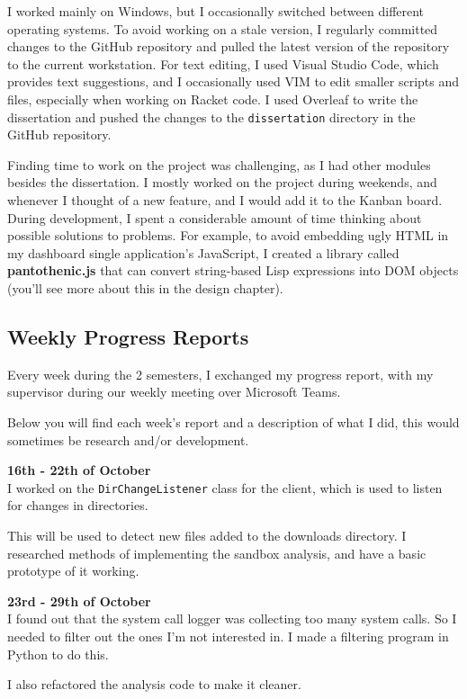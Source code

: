 I worked mainly on Windows, but I occasionally switched
between different operating systems. To avoid working on
a stale version, I regularly committed changes to the
GitHub repository and pulled the latest version of the
repository to the current workstation. For text editing,
I used Visual Studio Code, which provides text suggestions,
and I occasionally used VIM to edit smaller scripts and files,
especially when working on Racket code.
I used Overleaf to write the dissertation and pushed the changes to the
\texttt{dissertation} directory in the GitHub repository.

Finding time to work on the project was challenging,
as I had other modules besides the dissertation.
I mostly worked on the project during weekends, and whenever
I thought of a new feature, and I would add it to the Kanban board.
During development, I spent a considerable amount of time thinking
about possible solutions to problems. For example,
to avoid embedding ugly HTML in my dashboard single application's JavaScript,
I created a library called \textbf{pantothenic.js} that can convert 
string-based Lisp expressions into DOM objects
(you'll see more about this in the design chapter).

\subsection{Weekly Progress Reports}
Every week during the 2 semesters, I exchanged my progress report,
with my supervisor during our weekly meeting over Microsoft Teams.

Below you will find each week's report and a description of what I did,
this would sometimes be research and/or development.

\textbf{16th - 22th of October} \\
I worked on the \texttt{DirChangeListener} class for the client,
which is used to listen for changes in directories.

This will be used to detect new files added to the downloads directory.
I researched methods of implementing the sandbox analysis,
and have a basic prototype of it working.

\textbf{23rd - 29th of October} \\
I found out that the system call logger was collecting too many system calls.
So I needed to filter out the ones I'm not interested in.
I made a filtering program in Python to do this.

I also refactored the analysis code to make it cleaner.

